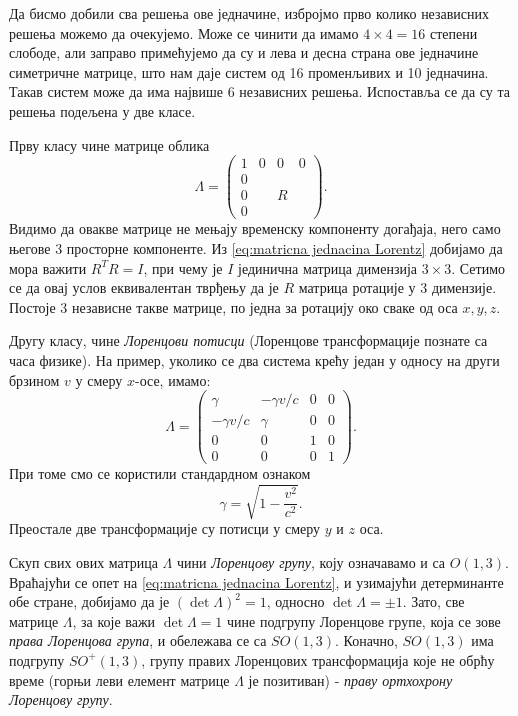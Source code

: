 \documentclass{report}
\theoremstyle{plain}
\theoremstyle{definition}
\begin{document}
Да бисмо добили сва решења ове једначине, избројмо прво колико независних решења можемо да очекујемо. Може се чинити да имамо $4\times 4 = 16$ степени слободе, али заправо примећујемо да су и лева и десна страна ове једначине симетричне матрице, што нам даје систем од 16 променљивих и 10 једначина. Такав систем може да има највише 6 независних решења. Испоставља се да су та решења подељена у две класе.

Прву класу чине матрице облика
$$\Lambda = \begin{pmatrix}
    1 & 0 & 0 & 0 \\
    0 &   &   &   \\
    0 &   & R &   \\
    0 &   &   &   
  \end{pmatrix}.$$
Видимо да овакве матрице не мењају временску компоненту догађаја, него само његове 3 просторне компоненте. Из \eqref{eq:matricna jednacina Lorentz} добијамо да мора важити $R^T R = I$, при чему је $I$ јединична матрица димензија $3\times 3$. Сетимо се да овај услов еквивалентан тврђењу да је $R$ матрица ротације у 3 димензије. Постоје 3 независне такве матрице, по једна за ротацију око сваке од оса $x, y, z$.

Другу класу, чине \emph{Лоренцови потисци} (Лоренцове трансформације познате са часа физике). На пример, уколико се два система крећу један у односу на други брзином $v$ у смеру $x$-осе, имамо:
$$\Lambda = \begin{pmatrix}
    \gamma & -\gamma v/c & 0 & 0 \\
    -\gamma v/c & \gamma & 0 & 0 \\
    0 &  0 & 1 & 0  \\
    0 & 0  & 0 & 1
  \end{pmatrix}.$$
При томе смо се користили стандардном ознаком 
$$\gamma = \sqrt{1-\frac{v^2}{c^2}}.$$
Преостале две трансформације су потисци у смеру $y$ и $z$ оса.

Скуп свих ових матрица $\Lambda$ чини \emph{Лоренцову групу}, коју означавамо и са $O(1, 3)$. Враћајући се опет на \eqref{eq:matricna jednacina Lorentz}, и узимајући детерминанте обе стране, добијамо да је $(\operatorname{det}\Lambda)^2 = 1$, односно $\operatorname{det}\Lambda = \pm 1$. Зато, све матрице $\Lambda$, за које важи $\operatorname{det}\Lambda = 1$ чине подгрупу Лоренцове групе, која се зове \emph{права Лоренцова група}, и обележава се са $SO(1, 3)$. Коначно, $SO(1, 3)$ има подгрупу $SO^+(1, 3)$, групу правих Лоренцових трансформација које не обрћу време (горњи леви елемент матрице $\Lambda$ је позитиван) - \emph{праву ортхохрону Лоренцову групу}.
\end{document}
